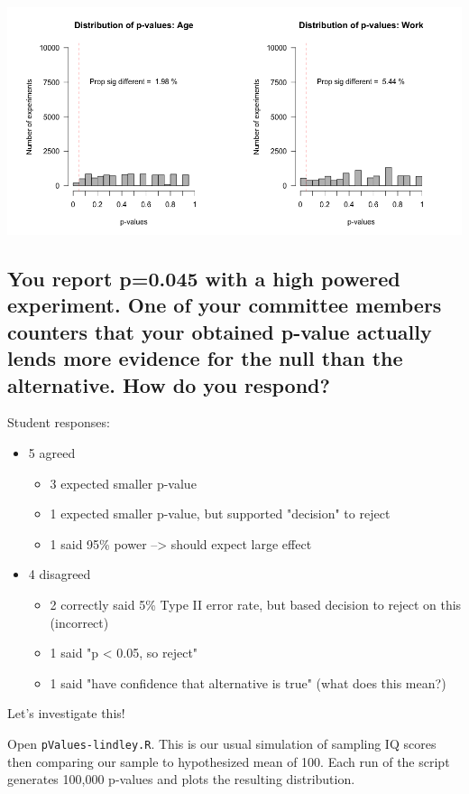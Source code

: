 \documentclass[11pt]{article}
\begin{document}
\includegraphics[width=.9\linewidth]{figures/ageWorkPvalues.png} 


\subsection*{You report p=0.045 with a high powered experiment.  One of your committee members counters that your obtained p-value actually lends more evidence for the null than the alternative.  How do you respond?}
\label{sec-1-2}

Student responses:
\begin{itemize}
\item 5 agreed
\begin{itemize}
\item 3 expected smaller p-value
\item 1 expected smaller p-value, but supported "decision" to reject
\item 1 said 95\% power --> should expect large effect
\end{itemize}
\item 4 disagreed
\begin{itemize}
\item 2 correctly said 5\% Type II error rate, but based decision to reject on this (incorrect)
\item 1 said "p < 0.05, so reject"
\item 1 said "have confidence that alternative is true" (what does this mean?)
\end{itemize}
\end{itemize}

Let's investigate this!

Open \verb~pValues-lindley.R~.  This is our usual simulation of sampling IQ scores then comparing our sample to hypothesized mean of 100.  Each run of the script generates 100,000 p-values and plots the resulting distribution.
\end{document}
